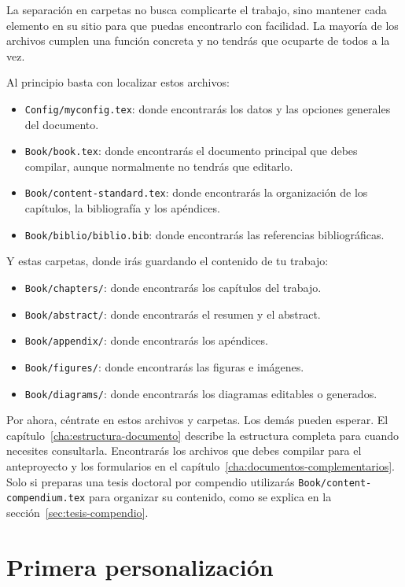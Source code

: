 La separación en carpetas no busca complicarte el trabajo, sino mantener cada elemento en su sitio para que puedas encontrarlo con facilidad. La mayoría de los archivos cumplen una función concreta y no tendrás que ocuparte de todos a la vez.

Al principio basta con localizar estos archivos:

\begin{itemize}
  \item \texttt{Config/myconfig.tex}: donde encontrarás los datos y las opciones generales del documento.
  \item \texttt{Book/book.tex}: donde encontrarás el documento principal que debes compilar, aunque normalmente no tendrás que editarlo.
  \item \texttt{Book/content-standard.tex}: donde encontrarás la organización de los capítulos, la bibliografía y los apéndices.
  \item \texttt{Book/biblio/biblio.bib}: donde encontrarás las referencias bibliográficas.
\end{itemize}

Y estas carpetas, donde irás guardando el contenido de tu trabajo:

\begin{itemize}
  \item \texttt{Book/chapters/}: donde encontrarás los capítulos del trabajo.
  \item \texttt{Book/abstract/}: donde encontrarás el resumen y el abstract.
  \item \texttt{Book/appendix/}: donde encontrarás los apéndices.
  \item \texttt{Book/figures/}: donde encontrarás las figuras e imágenes.
  \item \texttt{Book/diagrams/}: donde encontrarás los diagramas editables o generados.
\end{itemize}

Por ahora, céntrate en estos archivos y carpetas. Los demás pueden esperar. El capítulo~\ref{cha:estructura-documento} describe la estructura completa para cuando necesites consultarla. Encontrarás los archivos que debes compilar para el anteproyecto y los formularios en el capítulo~\ref{cha:documentos-complementarios}. Solo si preparas una tesis doctoral por compendio utilizarás \texttt{Book/content-compendium.tex} para organizar su contenido, como se explica en la sección~\ref{sec:tesis-compendio}.

\section{Primera personalización}
\label{sec:primera-personalizacion}

